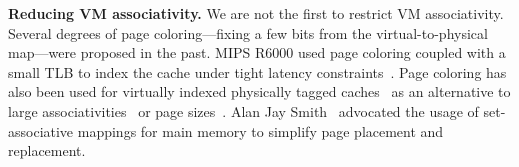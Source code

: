 
\noindent\textbf{Reducing VM associativity.} We are not the first to restrict VM associativity. Several degrees of page coloring---fixing a few bits from the virtual-to-physical map---were proposed in the past. MIPS R6000 used page coloring coupled with a small TLB to index the cache under tight latency constraints~\cite{taylor:tlb}. Page coloring has also been used for virtually indexed physically tagged caches~\cite{chiueh:eliminating} as an alternative to large associativities~\cite{gustafson:ibm} or page sizes~\cite{jouppi:architectural}. Alan Jay Smith~\cite{smith:comparative} advocated the usage of set-associative mappings for main memory to simplify page placement and replacement. 




